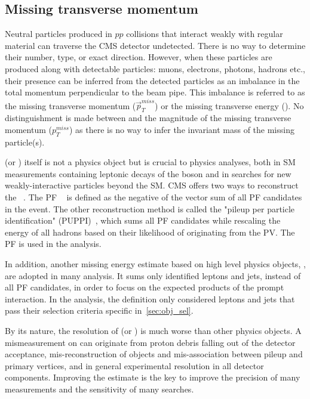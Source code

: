 \subsection{Missing transverse momentum}\label{sec:reco_met}

Neutral particles produced in $pp$ collisions that interact weakly with regular material can traverse the CMS detector undetected.
There is no way to determine their number, type, or exact direction.
However, when these particles are produced along with detectable particles: muons, electrons, photons, hadrons etc.,
their presence can be inferred from the detected particles as an imbalance in the total momentum perpendicular to the beam pipe.
This imbalance is referred to as the missing transverse momentum ($\vec{p}^{miss}_{T}$) or the missing transverse energy (\MET).
No distinguishment is made between \MET and the magnitude of the missing transverse momentum ($p^{miss}_{T}$) 
as there is no way to infer the invariant mass of the missing particle(s).

\MET (or \MHT) itself is not a physics object but is crucial to physics analyses, 
both in SM measurements containing leptonic decays of the \PW boson
and in searches for new weakly-interactive particles beyond the SM.
CMS offers two ways to reconstruct the \MET~\cite{Sirunyan_2019}.
The PF \MET~\cite{collaboration_2015} is defined as the negative of the vector \pt sum of all PF candidates in the event.
The other reconstruction method is called the "pileup per particle identification" (PUPPI)~\cite{Bertolini2014},
which sums all PF candidates while rescaling the energy of all hadrons based on their likelihood of originating from the PV.
The PF \MET is used in the \hmm analysis.

In addition, another missing energy estimate based on high level physics objects, \MHT, are adopted in many analysis.
It sums only identified leptons and jets, instead of all PF candidates, 
in order to focus on the expected products of the prompt interaction.
In the \hmm analysis, the \MHT definition only considered leptons and jets that pass their selection criteria specific in~\ref{sec:obj_sel}. 

By its nature, the resolution of \MET (or \MHT) is much worse than other physics objects.
A mismeasurement on \MET can originate from proton debris falling out of the detector acceptance,
mis-reconstruction of objects and mis-association between pileup and primary vertices,
and in general experimental resolution in all detector components.
Improving the \MET estimate is the key to improve the precision of many measurements and the sensitivity of many searches.


